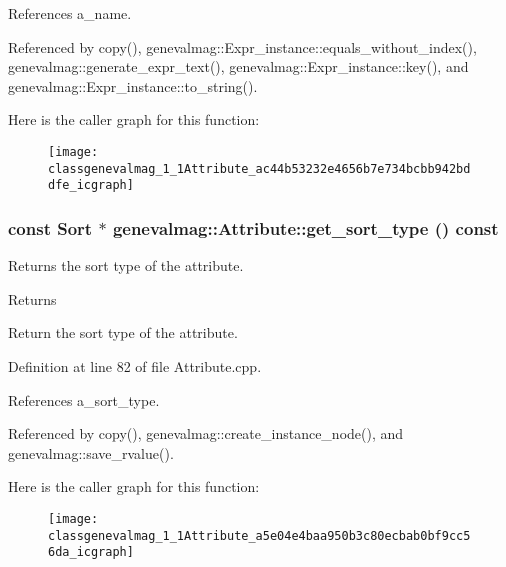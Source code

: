 References a\_\-name.



Referenced by copy(), genevalmag::Expr\_\-instance::equals\_\-without\_\-index(), genevalmag::generate\_\-expr\_\-text(), genevalmag::Expr\_\-instance::key(), and genevalmag::Expr\_\-instance::to\_\-string().



Here is the caller graph for this function:\nopagebreak
\begin{figure}[H]
\begin{center}
\leavevmode
\texttt{[image: classgenevalmag\_1\_1Attribute\_ac44b53232e4656b7e734bcbb942bddfe\_icgraph]}
\end{center}
\end{figure}


\hypertarget{classgenevalmag_1_1Attribute_a5e04e4baa950b3c80ecbab0bf9cc56da}{
\subsubsection[{get\_\-sort\_\-type}]{\setlength{\rightskip}{0pt plus 5cm}const {\bf Sort} $\ast$ genevalmag::Attribute::get\_\-sort\_\-type () const}}
\label{classgenevalmag_1_1Attribute_a5e04e4baa950b3c80ecbab0bf9cc56da}
Returns the sort type of the attribute. \begin{DoxyReturn}{Returns}

\end{DoxyReturn}
Return the sort type of the attribute. 

Definition at line 82 of file Attribute.cpp.



References a\_\-sort\_\-type.



Referenced by copy(), genevalmag::create\_\-instance\_\-node(), and genevalmag::save\_\-rvalue().



Here is the caller graph for this function:\nopagebreak
\begin{figure}[H]
\begin{center}
\leavevmode
\texttt{[image: classgenevalmag\_1\_1Attribute\_a5e04e4baa950b3c80ecbab0bf9cc56da\_icgraph]}
\end{center}
\end{figure}


